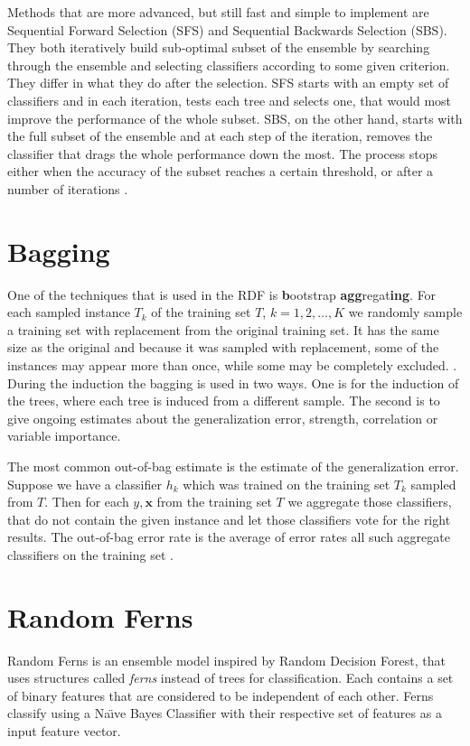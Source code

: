 \documentclass[thesis=B,english]{FITthesis}[2012/10/20]
\begin{document}
	Methods that are more advanced, but still fast and simple to implement are Sequential Forward Selection (SFS) and Sequential Backwards Selection (SBS). They both iteratively build sub-optimal subset of the ensemble by searching through the ensemble and selecting classifiers according to some given criterion. They differ in what they do after the selection. SFS starts with an empty set of classifiers and in each iteration, tests each tree and selects one, that would most improve the performance of the whole subset. SBS, on the other hand, starts with the full subset of the ensemble and at each step of the iteration, removes the classifier that drags the whole performance down the most. \cite{SELECTION_OF_DT} The process stops either when the accuracy of the subset reaches a certain threshold, or after a number of iterations \cite{DESIGNING-MULTIPLE-CLASS-SYS}. 

	\section{Bagging}
	One of the techniques that is used in the RDF is \textbf{b}ootstrap \textbf{agg}regat\textbf{ing}. For each sampled instance \(T_k\) of the training set \(T\), \(k = 1, 2, \dots, K \) we randomly sample a training set with replacement from the original training set. It has the same size as the original and because it was sampled with replacement, some of the instances may appear more than once, while some may be completely excluded. \cite{quinlan1996bagging}. During the induction the bagging is used in two ways. One is for the induction of the trees, where each tree is induced from a different sample. The second is to give ongoing estimates about the generalization error, strength, correlation or variable importance.

	The most common out-of-bag estimate is the estimate of the generalization error. Suppose we have a classifier \(h_k\) which was trained on the training set \(T_k\) sampled from \(T\). Then for each \(y,\mathbf{x}\) from the training set \(T\) we aggregate those classifiers, that do not contain the given instance and let those classifiers vote for the right results. The out-of-bag error rate is the average of error rates all such aggregate classifiers on the training set \cite{breiman1996out}.

	\section{Random Ferns}
	Random Ferns \cite{ozuysal2010fast,ozuysal2007fast} is an ensemble model inspired by Random Decision Forest, that uses structures called \emph{ferns} instead of trees for classification. Each contains a set of binary features that are considered to be independent of each other. Ferns classify using a Na\"{\i}ve Bayes Classifier with their respective set of features as a input feature vector.
\end{document}
